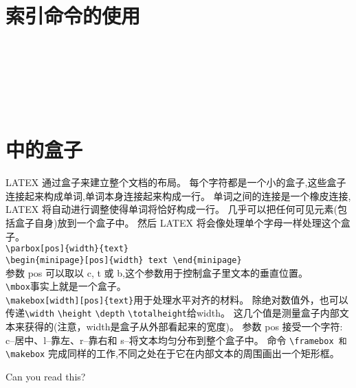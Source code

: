 \documentclass[12pt, a4paper, onecolumn, notitlepage]{article}
\begin{document}
\section{索引命令的使用}
  \text{}
  \text{}\\
  \text{}\\
  \text{}\\
  \text{}\\
  \text{}\\
\section{\LaTeXe 中的盒子}
LATEX 通过盒子来建立整个文档的布局。
每个字符都是一个小的盒子,这些盒子连接起来构成单词,单词本身连接起来构成一行。
单词之间的连接是一个橡皮连接, LATEX 将自动进行调整使得单词将恰好构成一行。
几乎可以把任何可见元素(包括盒子自身)放到一个盒子中。
然后 LATEX 将会像处理单个字母一样处理这个盒子。\\

\verb-\parbox[pos]{width}{text}-\\
\verb-\begin{minipage}[pos]{width} text \end{minipage}-\\
参数 pos 可以取以 c, t 或 b,这个参数用于控制盒子里文本的垂直位置。\\[20pt]

\verb-\mbox-事实上就是一个盒子。\\
\verb-\makebox[width][pos]{text}-用于处理水平对齐的材料。
除绝对数值外，也可以传递\verb-\width- \verb-\height- \verb-\depth- \verb-\totalheight-给width。
这几个值是测量盒子内部文本来获得的(注意，width是盒子从外部看起来的宽度)。
参数 pos 接受一个字符: c–居中、l–靠左、r–靠右和 s–将文本均匀分布到整个盒子中。
命令 \verb+\framebox 和 \makebox+ 完成同样的工作,不同之处在于它在内部文本的周围画出一个矩形框。\par
{}\par
{}\par
{} \par
{} \par
{}Can you read this?\\[20pt]
\end{document}
